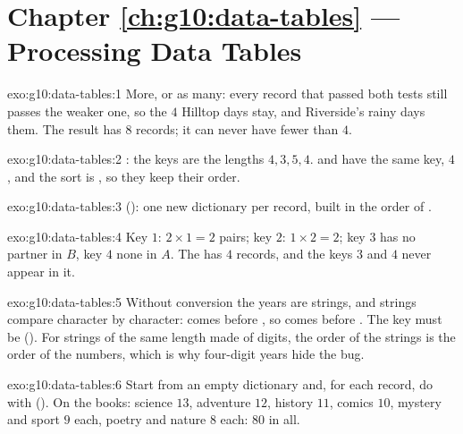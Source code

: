 \section*{Chapter \ref{ch:g10:data-tables} --- Processing Data Tables}

\begin{solution}{exo:g10:data-tables:1}
More, or as many: every record that passed both tests still passes the weaker one, so the $4$ Hilltop days stay,
and Riverside's rainy days  them. The result has $8$ records; it can never have fewer than $4$.
\end{solution}

\begin{solution}{exo:g10:data-tables:2}
: the keys are the lengths $4, 3, 5, 4$.  and  have
the same key, $4$, and the sort is , so they keep their order.
\end{solution}

\begin{solution}{exo:g10:data-tables:3}
 (): one new dictionary per
record, built in the order of .
\end{solution}

\begin{solution}{exo:g10:data-tables:4}
Key $1$: $2 \times 1 = 2$ pairs; key $2$: $1 \times 2 = 2$; key $3$ has no partner in $B$, key $4$ none in $A$. The
 has $4$ records, and the keys $3$ and $4$ never appear in it.
\end{solution}

\begin{solution}{exo:g10:data-tables:5}
Without conversion the years are strings, and strings compare character by character:  comes before
, so  comes before . The key must be 
(). For strings of the same length made of digits, the order of the strings is the order of
the numbers, which is why four-digit years hide the bug.
\end{solution}

\begin{solution}{exo:g10:data-tables:6}
Start from an empty dictionary and, for each record, do  with
 (). On the books: science $13$, adventure $12$, history $11$,
comics $10$, mystery and sport $9$ each, poetry and nature $8$ each: $80$ in all.
\end{solution}


